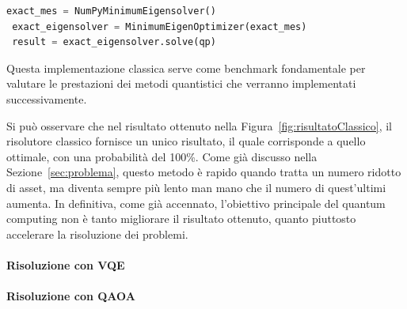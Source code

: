 \begin{lstlisting}[language=python, caption={Risoluzione classica del problema utilizzando \texttt{NumPyMinimumEigensolver.}}]
 exact_mes = NumPyMinimumEigensolver()
 exact_eigensolver = MinimumEigenOptimizer(exact_mes)
 result = exact_eigensolver.solve(qp)
\end{lstlisting}

Questa implementazione classica serve come benchmark fondamentale per 
valutare le prestazioni dei metodi quantistici che verranno 
implementati successivamente.

Si può osservare che nel risultato ottenuto nella Figura~\ref{fig:risultatoClassico}, il risolutore 
classico fornisce un unico risultato, il quale corrisponde a quello ottimale, con una probabilità 
del 100\%. Come già discusso nella Sezione~\ref{sec:problema}, questo metodo 
è rapido quando tratta un numero ridotto di asset, ma diventa sempre più lento 
man mano che il numero di quest'ultimi aumenta. In definitiva, come già accennato, 
l'obiettivo principale del quantum computing non è tanto migliorare il 
risultato ottenuto, quanto piuttosto accelerare la risoluzione dei problemi.

\paragraph{Risoluzione con VQE}
\paragraph{Risoluzione con QAOA}




